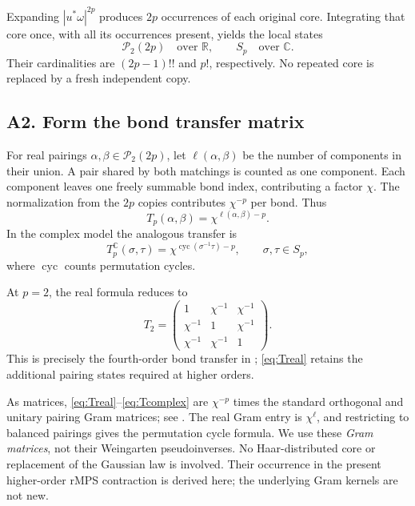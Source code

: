 \documentclass[11pt]{article}
\numberwithin{equation}{section}
\theoremstyle{definition}\newtheorem{definition}[theorem]{Definition}
\theoremstyle{remark}\newtheorem{remark}[theorem]{Remark}
\newcommand{\R}{\mathbb R}\newcommand{\E}{\mathbb E}\newcommand{\Prob}{\mathbb P}
\newcommand{\C}{\mathbb C}
\newcommand{\cyc}{\operatorname{cyc}}
\begin{document}
Expanding $|u^*\omega|^{2p}$ produces $2p$ occurrences of each original core.
Integrating that core once, with all its occurrences present, yields the local
states
\[
 \mathcal P_2(2p)\quad\text{over }\R,\qquad
 S_p\quad\text{over }\C.
\]
Their cardinalities are $(2p-1)!!$ and $p!$, respectively.
No repeated core is replaced by a fresh independent copy.

\subsection{A2. Form the bond transfer matrix}
For real pairings $\alpha,\beta\in\mathcal P_2(2p)$, let
$\ell(\alpha,\beta)$ be the number of components in their union.
A pair shared by both matchings is counted as one component. Each component
leaves one freely summable bond index, contributing a factor $\chi$.
The normalization from the $2p$ copies contributes $\chi^{-p}$ per bond. Thus
\begin{equation}\label{eq:Treal}
 T_p(\alpha,\beta)=\chi^{\ell(\alpha,\beta)-p}.
\end{equation}
In the complex model the analogous transfer is
\begin{equation}\label{eq:Tcomplex}
 T_p^{\C}(\sigma,\tau)
 =\chi^{\cyc(\sigma^{-1}\tau)-p},\qquad \sigma,\tau\in S_p,
\end{equation}
where $\cyc$ counts permutation cycles.

At $p=2$, the real formula reduces to
\begin{equation}\label{eq:T2}
 T_2=\begin{pmatrix}
 1&\chi^{-1}&\chi^{-1}\\
 \chi^{-1}&1&\chi^{-1}\\
 \chi^{-1}&\chi^{-1}&1
 \end{pmatrix}.
\end{equation}
This is precisely the fourth-order bond transfer in
\cite[Section~4.4.1, equation~(4.8)]{CEMT}; \eqref{eq:Treal} retains the additional
pairing states required at higher orders.

As matrices, \eqref{eq:Treal}--\eqref{eq:Tcomplex} are $\chi^{-p}$ times the
standard orthogonal and unitary pairing Gram matrices; see
\cite[Section~2]{CollinsMatsumoto}. The real Gram entry is $\chi^{\ell}$,
and restricting to balanced pairings gives the permutation cycle formula.
We use these \emph{Gram matrices}, not their Weingarten pseudoinverses.
No Haar-distributed core or replacement of the Gaussian law is involved.
Their occurrence in the present higher-order rMPS contraction is derived here;
the underlying Gram kernels are not new.
\end{document}
